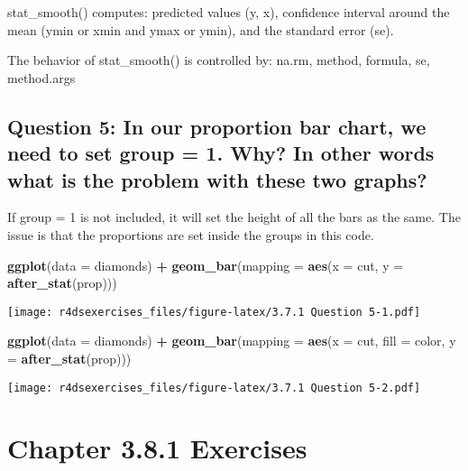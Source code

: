 \documentclass[
]{book}
\newenvironment{Shaded}{\begin{snugshade}}{\end{snugshade}}
\newcommand{\DataTypeTok}[1]{\textcolor[rgb]{0.13,0.29,0.53}{#1}}
\newcommand{\KeywordTok}[1]{\textcolor[rgb]{0.13,0.29,0.53}{\textbf{#1}}}
\newcommand{\NormalTok}[1]{#1}
\newcommand{\OperatorTok}[1]{\textcolor[rgb]{0.81,0.36,0.00}{\textbf{#1}}}
\newcommand{\StringTok}[1]{\textcolor[rgb]{0.31,0.60,0.02}{#1}}
\begin{document}
stat\_smooth() computes: predicted values (y, x), confidence interval around the mean (ymin or xmin and ymax or ymin), and the standard error (se).

The behavior of stat\_smooth() is controlled by: na.rm, method, formula, se, method.args

\hypertarget{question-5-in-our-proportion-bar-chart-we-need-to-set-group-1.-why-in-other-words-what-is-the-problem-with-these-two-graphs}{%
\subsection{Question 5: In our proportion bar chart, we need to set group = 1. Why? In other words what is the problem with these two graphs?}\label{question-5-in-our-proportion-bar-chart-we-need-to-set-group-1.-why-in-other-words-what-is-the-problem-with-these-two-graphs}}

If group = 1 is not included, it will set the height of all the bars as the same. The issue is that the proportions are set inside the groups in this code.

\begin{Shaded}
\begin{Highlighting}[]
\KeywordTok{ggplot}\NormalTok{(}\DataTypeTok{data =}\NormalTok{ diamonds) }\OperatorTok{+}\StringTok{ }
\StringTok{  }\KeywordTok{geom_bar}\NormalTok{(}\DataTypeTok{mapping =} \KeywordTok{aes}\NormalTok{(}\DataTypeTok{x =}\NormalTok{ cut, }\DataTypeTok{y =} \KeywordTok{after_stat}\NormalTok{(prop)))}
\end{Highlighting}
\end{Shaded}

\texttt{[image: r4dsexercises\_files/figure-latex/3.7.1 Question 5-1.pdf]}

\begin{Shaded}
\begin{Highlighting}[]
\KeywordTok{ggplot}\NormalTok{(}\DataTypeTok{data =}\NormalTok{ diamonds) }\OperatorTok{+}\StringTok{ }
\StringTok{  }\KeywordTok{geom_bar}\NormalTok{(}\DataTypeTok{mapping =} \KeywordTok{aes}\NormalTok{(}\DataTypeTok{x =}\NormalTok{ cut, }\DataTypeTok{fill =}\NormalTok{ color, }\DataTypeTok{y =} \KeywordTok{after_stat}\NormalTok{(prop)))}
\end{Highlighting}
\end{Shaded}

\texttt{[image: r4dsexercises\_files/figure-latex/3.7.1 Question 5-2.pdf]}

\hypertarget{chapter-3.8.1-exercises}{%
\section{Chapter 3.8.1 Exercises}\label{chapter-3.8.1-exercises}}
\end{document}
